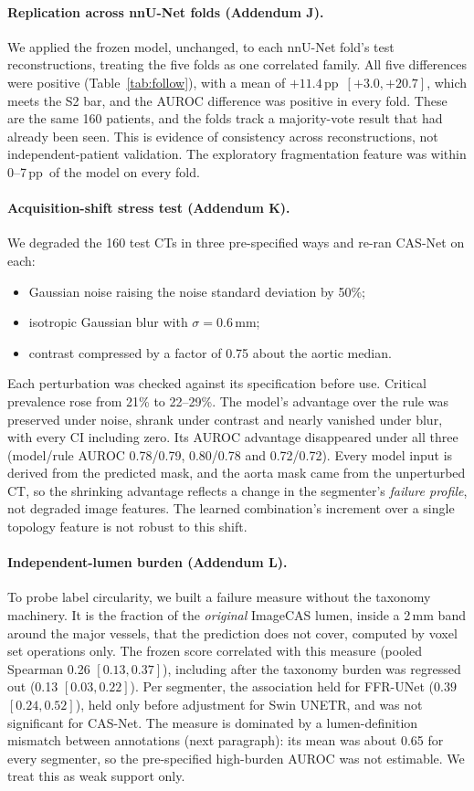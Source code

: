 \documentclass[11pt]{article}
\newcommand{\pp}{\,pp}
\begin{document}
\paragraph{Replication across nnU-Net folds (Addendum J).} We applied the frozen model, unchanged, to each nnU-Net fold's test reconstructions, treating the five folds as one correlated family. All five differences were positive (Table~\ref{tab:follow}), with a mean of $+11.4$\pp\ $[+3.0, +20.7]$, which meets the S2 bar, and the AUROC difference was positive in every fold. These are the same 160 patients, and the folds track a majority-vote result that had already been seen. This is evidence of consistency across reconstructions, not independent-patient validation. The exploratory fragmentation feature was within 0--7\pp\ of the model on every fold.

\paragraph{Acquisition-shift stress test (Addendum K).} We degraded the 160 test CTs in three pre-specified ways and re-ran CAS-Net on each:
\begin{itemize}
\item Gaussian noise raising the noise standard deviation by 50\%;
\item isotropic Gaussian blur with $\sigma = 0.6$\,mm;
\item contrast compressed by a factor of 0.75 about the aortic median.
\end{itemize}
Each perturbation was checked against its specification before use. Critical prevalence rose from 21\% to 22--29\%. The model's advantage over the rule was preserved under noise, shrank under contrast and nearly vanished under blur, with every CI including zero. Its AUROC advantage disappeared under all three (model/rule AUROC 0.78/0.79, 0.80/0.78 and 0.72/0.72). Every model input is derived from the predicted mask, and the aorta mask came from the unperturbed CT, so the shrinking advantage reflects a change in the segmenter's \emph{failure profile}, not degraded image features. The learned combination's increment over a single topology feature is not robust to this shift.

\paragraph{Independent-lumen burden (Addendum L).} To probe label circularity, we built a failure measure without the taxonomy machinery. It is the fraction of the \emph{original} ImageCAS lumen, inside a 2\,mm band around the major vessels, that the prediction does not cover, computed by voxel set operations only. The frozen score correlated with this measure (pooled Spearman 0.26 $[0.13, 0.37]$), including after the taxonomy burden was regressed out (0.13 $[0.03, 0.22]$). Per segmenter, the association held for FFR-UNet ($0.39$ $[0.24, 0.52]$), held only before adjustment for Swin UNETR, and was not significant for CAS-Net. The measure is dominated by a lumen-definition mismatch between annotations (next paragraph): its mean was about 0.65 for every segmenter, so the pre-specified high-burden AUROC was not estimable. We treat this as weak support only.
\end{document}
